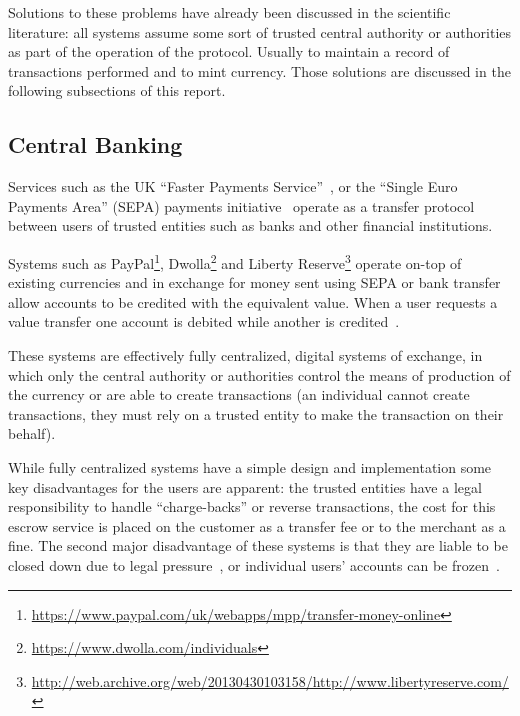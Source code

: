 Solutions to these problems have already been discussed in the scientific
literature: all systems assume some sort of trusted central authority or authorities
as part of the operation of the
protocol. Usually to maintain a record of transactions performed and to mint
currency.  Those solutions are discussed in the following subsections of this report.

\subsection{Central Banking}
Services such as the UK ``Faster Payments Service''~\cite{guadian-fps}, or
the ``Single Euro Payments Area'' (SEPA) payments initiative~\cite{SEPA}
operate as a transfer protocol between users of trusted entities
such as banks and other financial institutions.

Systems such as PayPal\footnote{\url{https://www.paypal.com/uk/webapps/mpp/transfer-money-online}},
Dwolla\footnote{\url{https://www.dwolla.com/individuals}}
and Liberty Reserve\footnote{\url{http://web.archive.org/web/20130430103158/http://www.libertyreserve.com/}}
operate on-top of existing currencies and in exchange for
money sent using SEPA or bank transfer allow accounts to be credited
with the equivalent value.  When a user requests a value transfer
one account is debited while another is credited~\cite{paypal}.

These systems are effectively
fully centralized, digital systems of exchange, in which only the
central authority or authorities control the means of production of the
currency or are able to create transactions (an individual cannot create
transactions, they must rely on a trusted entity to make the transaction
on their behalf).

While fully centralized systems have a simple design and implementation
some key disadvantages for the users are apparent:
the trusted entities have a legal responsibility to handle
``charge-backs'' or reverse transactions, the cost for this escrow
service is placed on the customer as a transfer fee or to the merchant as
a fine. The second major disadvantage of these systems is that they are
liable to be closed down due to legal pressure~\cite{lr-shutdown}, or individual
users' accounts can be frozen~\cite{mtgox-dwolla}.

